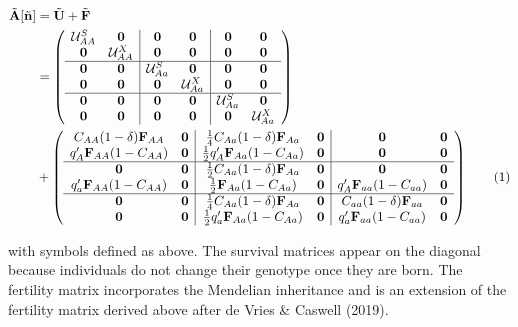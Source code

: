 \documentclass[11pt]{article}
\newcommand\numberthis{\addtocounter{equation}{1}\tag{\theequation}}
\def\mbf#1{\mathbf{#1}}
\def\mcal#1{\mathcal{#1}}
\begin{document}
\begin{align*} \label{eq:AtildeCoexistence}
	\tilde{\mbf{A}}[\tilde{\mbf{n}}] &= \tilde{\mbf{U}} + \tilde{\mbf{F}} \\
		&= \left(
			\begin{array}{cc|cc|cc}
				\mcal{U}^S_{AA} & \mbf{0} & \mbf{0} & \mbf{0} & \mbf{0} & \mbf{0} \\ 
				\mbf{0} & \mcal{U}^X_{AA} & \mbf{0} & \mbf{0} & \mbf{0} & \mbf{0} \\\hline
				\mbf{0} & \mbf{0} & \mcal{U}^S_{Aa} & \mbf{0} & \mbf{0} & \mbf{0} \\
				\mbf{0} & \mbf{0} & \mbf{0} & \mcal{U}^X_{Aa} & \mbf{0} &  \mbf{0}\\\hline
				\mbf{0} & \mbf{0} & \mbf{0} & \mbf{0} & \mcal{U}^S_{Aa} & \mbf{0} \\ 
				\mbf{0} & \mbf{0} & \mbf{0} & \mbf{0} & \mbf{0} & \mcal{U}^X_{Aa}
			\end{array} \right) \\ 
		&+ \left(
			\begin{array}{cc|cc|cc}
				C_{AA} (1 - \delta) \mbf{F}_{AA} & \mbf{0} & \frac{1}{4} C_{Aa} (1 - \delta) \mbf{F}_{Aa} & \mbf{0} & \mbf{0} & \mbf{0} \\ 
				q^{\prime}_{A} \mbf{F}_{AA} (1 - C_{AA}) & \mbf{0} & \frac{1}{2} q^{\prime}_{A} \mbf{F}_{Aa} (1 - C_{Aa}) & \mbf{0} & \mbf{0} & \mbf{0} \\ \hline
				\mbf{0} & \mbf{0} & \frac{1}{2} C_{Aa} (1 - \delta) \mbf{F}_{Aa} & \mbf{0} & \mbf{0} & \mbf{0} \\
				q^{\prime}_{a} \mbf{F}_{AA} (1 - C_{AA}) & \mbf{0} & \frac{1}{2} \mbf{F}_{Aa} (1 - C_{Aa}) & \mbf{0} & q^{\prime}_{A} \mbf{F}_{aa} (1 - C_{aa}) & \mbf{0}\\ \hline
				\mbf{0} & \mbf{0} & \frac{1}{4} C_{Aa} (1 - \delta) \mbf{F}_{Aa} & \mbf{0} & C_{aa} (1 - \delta) \mbf{F}_{aa} & \mbf{0} \\ 
				\mbf{0} & \mbf{0} & \frac{1}{2} q^{\prime}_{a} \mbf{F}_{Aa} (1 - C_{Aa})  & \mbf{0} & q^{\prime}_{a} \mbf{F}_{aa} (1 - C_{aa}) & \mbf{0}
			\end{array} \right) \numberthis
\end{align*}

\noindent with symbols defined as above. The survival matrices appear on the diagonal because individuals do not change their genotype once they are born. The fertility matrix incorporates the Mendelian inheritance and is an extension of the fertility matrix derived above after de Vries \& Caswell (2019).
\end{document}
